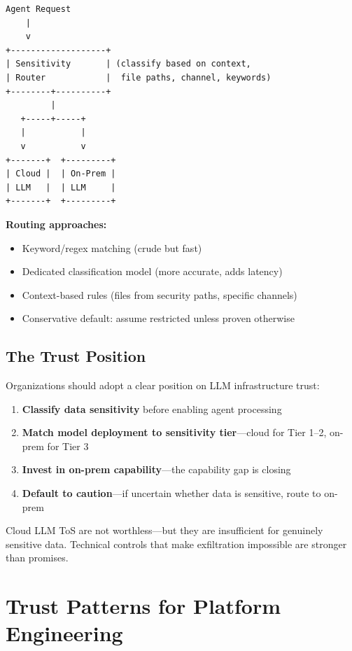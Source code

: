 \begin{lstlisting}[caption={Hybrid LLM Architecture}]
Agent Request
    |
    v
+-------------------+
| Sensitivity       | (classify based on context,
| Router            |  file paths, channel, keywords)
+--------+----------+
         |
   +-----+-----+
   |           |
   v           v
+-------+  +---------+
| Cloud |  | On-Prem |
| LLM   |  | LLM     |
+-------+  +---------+
\end{lstlisting}

\textbf{Routing approaches:}
\begin{itemize}
    \item Keyword/regex matching (crude but fast)
    \item Dedicated classification model (more accurate, adds latency)
    \item Context-based rules (files from security paths, specific channels)
    \item Conservative default: assume restricted unless proven otherwise
\end{itemize}

\subsection{The Trust Position}
\label{subsec:trust-position}

Organizations should adopt a clear position on LLM infrastructure trust:

\begin{enumerate}
    \item \textbf{Classify data sensitivity} before enabling agent processing
    \item \textbf{Match model deployment to sensitivity tier}---cloud for Tier 1--2, on-prem for Tier 3
    \item \textbf{Invest in on-prem capability}---the capability gap is closing
    \item \textbf{Default to caution}---if uncertain whether data is sensitive, route to on-prem
\end{enumerate}

Cloud LLM ToS are not worthless---but they are insufficient for genuinely sensitive data. Technical controls that make exfiltration impossible are stronger than promises.

\section{Trust Patterns for Platform Engineering}
\label{sec:trust-patterns}

